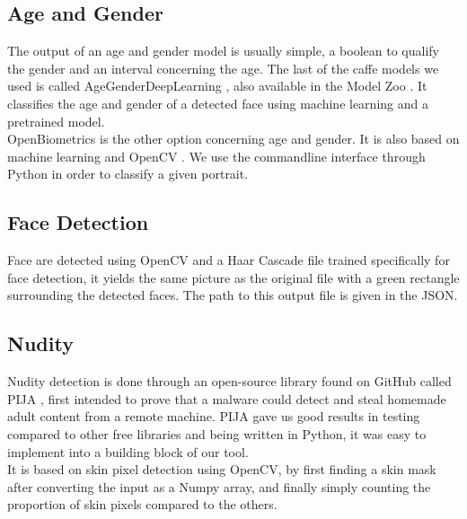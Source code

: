 \documentclass{article}
\begin{document}
    \subsection{Age and Gender}
        The output of an age and gender model is usually simple, a boolean to qualify the gender and an interval concerning the age.
        The last of the caffe models we used is called AgeGenderDeepLearning \cite{age}, also available in the Model Zoo \cite{zoo}. It classifies the age and gender of a detected face using machine learning and a pretrained model.
        \\OpenBiometrics \cite{openbr} is the other option concerning age and gender. It is also based on machine learning and OpenCV \cite{opencv}. We use the commandline interface through Python in order to classify a given portrait.
    \subsection{Face Detection}
        Face are detected using OpenCV and a Haar Cascade file trained specifically for face detection, it yields the same picture as the original file with a green rectangle surrounding the detected faces. The path to this output file is given in the JSON.
    \subsection{Nudity}
        Nudity detection is done through an open-source library found on GitHub called PIJA \cite{pija}, first intended to prove that a malware could detect and steal homemade adult content from a remote machine. PIJA gave us good results in testing compared to other free libraries and being written in Python, it was easy to implement into a building block of our tool. 
        \\It is based on skin pixel detection using OpenCV, by first finding a skin mask after converting the input as a Numpy array, and finally simply counting the proportion of skin pixels compared to the others.
    \newpage
\end{document}
